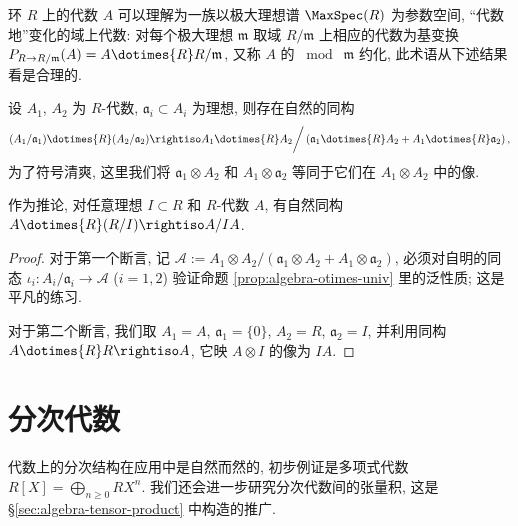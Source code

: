 环 $R$ 上的代数 $A$ 可以理解为一族以极大理想谱 $\MaxSpec(R)$ 为参数空间, ``代数地''变化的域上代数: 对每个极大理想 $\mathfrak{m}$ 取域 $R/\mathfrak{m}$ 上相应的代数为基变换 $P_{R \to R/\mathfrak{m}} (A) = A \dotimes{R} R/\mathfrak{m}$, 又称 $A$ 的 $\bmod\; \mathfrak{m}$ 约化, 此术语从下述结果看是合理的.
\begin{lemma}
	设 $A_1$, $A_2$ 为 $R$-代数, $\mathfrak{a}_i \subset A_i$ 为理想, 则存在自然的同构
	\[ (A_1/\mathfrak{a}_1) \dotimes{R} (A_2/\mathfrak{a}_2) \rightiso A_1 \dotimes{R} A_2 \bigg/ \left( \mathfrak{a}_1 \dotimes{R} A_2 + A_1 \dotimes{R} \mathfrak{a}_2\right), \]
	为了符号清爽, 这里我们将 $\mathfrak{a}_1 \otimes A_2$ 和 $A_1 \otimes \mathfrak{a}_2$ 等同于它们在 $A_1 \otimes A_2$ 中的像.
	
	作为推论, 对任意理想 $I \subset R$ 和 $R$-代数 $A$, 有自然同构 $A \dotimes{R} (R/I) \rightiso A/IA$.
\end{lemma}
\begin{proof}
	对于第一个断言, 记 $\mathscr{A} := A_1 \otimes A_2 \big/ \left( \mathfrak{a}_1 \otimes A_2 + A_1 \otimes \mathfrak{a}_2\right)$, 必须对自明的同态 $\iota_i: A_i/\mathfrak{a}_i \to \mathscr{A}$ ($i=1,2$) 验证命题 \ref{prop:algebra-otimes-univ} 里的泛性质; 这是平凡的练习.

	对于第二个断言, 我们取 $A_1 = A$, $\mathfrak{a}_1=\{0\}$, $A_2 = R$, $\mathfrak{a}_2 = I$, 并利用同构 $A \dotimes{R} R \rightiso A$, 它映 $A \otimes I$ 的像为 $IA$.
\end{proof}

\section{分次代数}
代数上的分次结构在应用中是自然而然的, 初步例证是多项式代数 $R[X] = \bigoplus_{n \geq 0} R X^n$. 我们还会进一步研究分次代数间的张量积, 这是 \S\ref{sec:algebra-tensor-product} 中构造的推广.

